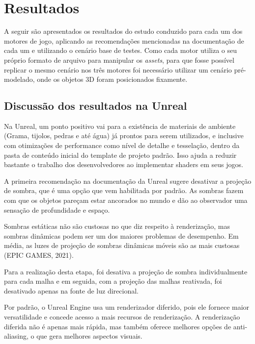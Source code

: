 \chapter{Resultados}
\label{chap:resultados}

A seguir são apresentados os resultados do estudo conduzido para cada um dos motores de jogo, aplicando as recomendações mencionadas na documentação de cada um e utilizando o cenário base de testes. Como cada motor utiliza o seu próprio formato de arquivo para manipular os \textit{assets}, para que fosse possível replicar o mesmo cenário nos três motores foi necessário utilizar um cenário pré-modelado, onde os objetos 3D foram posicionados fixamente.

\section{Discussão dos resultados na Unreal}
\label{sec:resultado-unreal}

Na Unreal, um ponto positivo vai para a existência de materiais de ambiente (Grama, tijolos, pedras e até água) já prontos para serem utilizados, e inclusive com otimizações de performance como nível de detalhe e tesselação, dentro da pasta de conteúdo inicial do template de projeto padrão. Isso ajuda a reduzir bastante o trabalho dos desenvolvedores ao implementar shaders em seus jogos.

A primeira recomendação na documentação da Unreal sugere desativar a projeção de sombra, que é uma opção que vem habilitada por padrão. As sombras fazem com que os objetos pareçam estar ancorados no mundo e dão ao observador uma sensação de profundidade e espaço. 

Sombras estáticas não são custosas no que diz respeito à renderização, mas sombras dinâmicas podem ser um dos maiores problemas de desempenho. Em média, as luzes de projeção de sombras dinâmicas móveis são as mais custosas (EPIC GAMES, 2021).

Para a realização desta etapa, foi desativa a projeção de sombra individualmente para cada malha e em seguida, com a projeção das malhas reativada, foi desativado apenas na fonte de luz direcional.

Por padrão, o Unreal Engine usa um renderizador diferido, pois ele fornece maior versatilidade e concede acesso a mais recursos de renderização. A renderização diferida não é apenas mais rápida, mas também oferece melhores opções de anti-aliasing, o que gera melhores aspectos visuais.

